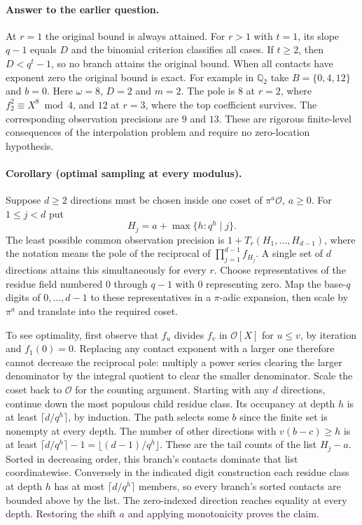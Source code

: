 \paragraph{Answer to the earlier question.}
At $r=1$ the original bound is always attained. For $r>1$ with $t=1$, its slope $q-1$ equals $D$ and the binomial criterion classifies all cases. If $t\ge2$, then $D<q^t-1$, so no branch attains the original bound. When all contacts have exponent zero the original bound is exact. For example in $\mathbb Q_2$ take $B=\{0,4,12\}$ and $b=0$. Here $\omega=8$, $D=2$ and $m=2$. The pole is $8$ at $r=2$, where $f_2^2\equiv X^8\bmod4$, and $12$ at $r=3$, where the top coefficient survives. The corresponding observation precisions are $9$ and $13$. These are rigorous finite-level consequences of the interpolation problem and require no zero-location hypothesis.

\paragraph{Corollary (optimal sampling at every modulus).}
Suppose $d\ge2$ directions must be chosen inside one coset of $\pi^a\mathcal O$, $a\ge0$. For $1\le j<d$ put
\[
 H_j=a+\max\{h:q^h\mid j\}.
\]
The least possible common observation precision is $1+T_r(H_1,\ldots,H_{d-1})$, where the notation means the pole of the reciprocal of $\prod_{j=1}^{d-1} f_{H_j}$. A single set of $d$ directions attains this simultaneously for every $r$. Choose representatives of the residue field numbered $0$ through $q-1$ with $0$ representing zero. Map the base-$q$ digits of $0,\ldots,d-1$ to these representatives in a $\pi$-adic expansion, then scale by $\pi^a$ and translate into the required coset.

To see optimality, first observe that $f_u$ divides $f_v$ in $\mathcal O[X]$ for $u\le v$, by iteration and $f_1(0)=0$. Replacing any contact exponent with a larger one therefore cannot decrease the reciprocal pole: multiply a power series clearing the larger denominator by the integral quotient to clear the smaller denominator. Scale the coset back to $\mathcal O$ for the counting argument. Starting with any $d$ directions, continue down the most populous child residue class. Its occupancy at depth $h$ is at least $\lceil d/q^h\rceil$, by induction. The path selects some $b$ since the finite set is nonempty at every depth. The number of other directions with $v(b-c)\ge h$ is at least $\lceil d/q^h\rceil-1=\lfloor(d-1)/q^h\rfloor$. These are the tail counts of the list $H_j-a$. Sorted in decreasing order, this branch's contacts dominate that list coordinatewise. Conversely in the indicated digit construction each residue class at depth $h$ has at most $\lceil d/q^h\rceil$ members, so every branch's sorted contacts are bounded above by the list. The zero-indexed direction reaches equality at every depth. Restoring the shift $a$ and applying monotonicity proves the claim.

